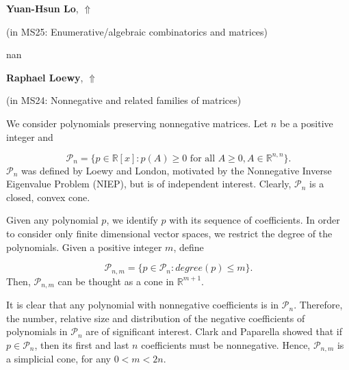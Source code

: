\documentclass[ILAS2025-program.tex]{subfiles}
\begin{document}
     \hypertarget{down0367}{}\begin{ilasabstract}
    
    \textbf{Yuan-Hsun Lo},  \hfill \hyperlink{up0367}{$\Uparrow$}
    
    (in {\color{mstitle}MS25: Enumerative/algebraic combinatorics and matrices})
        
        \mtskip
    nan\end{ilasabstract}
     \hypertarget{down0354}{}\begin{ilasabstract}
    
    \textbf{Raphael Loewy},  \hfill \hyperlink{up0354}{$\Uparrow$}
    
    (in {\color{mstitle}MS24: Nonnegative and related families of matrices})
        
        \mtskip
    We consider polynomials preserving nonnegative matrices. Let $n$ be a positive integer and

\begin{equation*}
{\mathcal{P}}_{n}=\{p \in {{\mathbb{R}}}[x]: p(A)\geq 0 \mbox{ for all~}  A \geq 0, A \in {\mathbb{R}}^{n,n}\}.
\end{equation*}
${\mathcal{P}}_{n}$ was defined by Loewy and London, motivated by the Nonnegative Inverse Eigenvalue Problem (NIEP), but is of independent interest. Clearly, ${\mathcal{P}}_{n}$ is a closed, convex cone.

\medskip
Given any polynomial $p$, we identify $p$ with its sequence of coefficients. In order to consider only finite dimensional vector spaces, we restrict the degree of the polynomials. Given a positive integer $m$, define

\begin{equation*}
{\mathcal{P}}_{n,m}=\{p \in {\mathcal{P}}_{n} : degree(p) \leq m \}.
\end{equation*}
Then, ${\mathcal{P}}_{n,m}$ can be thought as a cone in ${\mathbb{R}}^{m+1}$.

\medskip
It is clear that any polynomial with nonnegative coefficients is in ${\mathcal{P}}_{n}$. Therefore, the number, relative size and distribution of the negative coefficients of polynomials in ${\mathcal{P}}_{n}$ are of significant interest. Clark and Paparella showed that if $p \in {\mathcal{P}}_{n}$, then its first and last $n$ coefficients must be nonnegative. Hence, ${\mathcal{P}}_{n,m}$ is a simplicial cone, for any $0 < m <2n$.


\end{ilasabstract}
\end{document}
